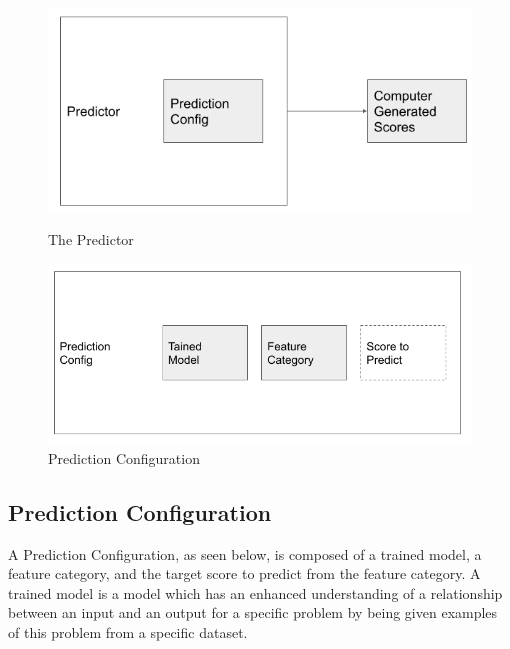 \begin{figure}[h]
  \begin{minipage}{0.48\textwidth}
     \centering
     \includegraphics[width=.7\linewidth]{pngs/predictor-1111.png}
     \caption{The Predictor}\label{Fig:Data1}
  \end{minipage}\hfill
  \begin{minipage}{0.48\textwidth}
     \centering
     \includegraphics[width=.7\linewidth]{pngs/prediction-config.png}
     \caption{Prediction Configuration}\label{Fig:Data2}
  \end{minipage}
\end{figure}


\subsection{Prediction Configuration}

A Prediction Configuration, as seen below, is composed of a trained model, a feature category, and the target score to predict from the feature category. A trained model is a model which has an enhanced understanding of a relationship between an input and an output for a specific problem by being given examples of this problem from a specific dataset.  

